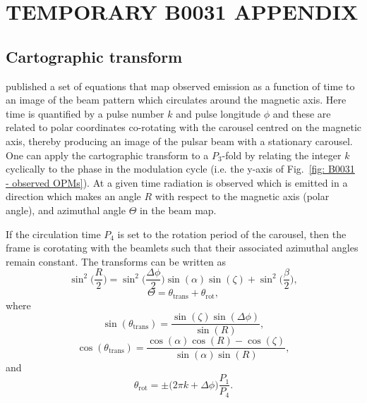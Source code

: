 
\chapter{TEMPORARY B0031 APPENDIX} %
\label{app: TEMP B0031 APPENDIX}

\section{Cartographic transform}
\label{app: B0031temp - cartographic transform}
\citet{DRxx2001} published a set of equations that map observed emission as a function of time to an image of the beam pattern which circulates around the magnetic axis. Here time is quantified by a pulse number $k$ and pulse longitude $\phi$ and these are related to polar coordinates co-rotating with the carousel centred on the magnetic axis, thereby producing an image of the pulsar beam with a stationary carousel. One can apply the cartographic transform to a $P_3$-fold by relating the integer $k$ cyclically to the phase in the modulation cycle (i.e. the y-axis of Fig.~\ref{fig: B0031 - observed OPMs}). At a given time radiation is observed which is emitted in a direction which makes an angle $R$ with respect to the magnetic axis (polar angle), and azimuthal angle $\Theta$ in the beam map.

If the circulation time $P_4$ is set to the rotation period of the carousel, then the frame is corotating with the beamlets such that their associated azimuthal angles remain constant. The transforms can be written as
\begin{equation}
    \label{eq: cartographic transform - R}
    \sin^2\bigg(\frac{R}{2}\bigg) = \sin^2\bigg(  \frac{\Delta\phi}{2} \bigg)\sin(\alpha)\sin(\zeta) + \sin^2\bigg(\frac{\beta}{2} \bigg),
\end{equation}
\begin{equation}
    \label{eq: cartographic transform - Theta}
    \Theta = \theta_\mathrm{trans} + \theta_\mathrm{rot},
\end{equation}
    where
\begin{equation}
    \label{eq: cartographic transform - sin theta_trans}
    \sin(\theta_\mathrm{trans}) = \frac{\sin(\zeta)\sin(\Delta\phi)}{\sin(R)},
\end{equation}
\begin{equation}
    \label{eq: cartographic transform - cos theta_trans}
    \cos(\theta_\mathrm{trans}) = \frac{\cos(\alpha)\cos(R) - \cos(\zeta)}{\sin(\alpha)\sin(R)},
\end{equation}
    and
\begin{equation}
    \label{eq: cartographic transform - theta_rot}
    \theta_\mathrm{rot} =  \pm\bigg(2\pi k + \Delta\phi\bigg)\frac{P_1}{P_4}.
\end{equation}

